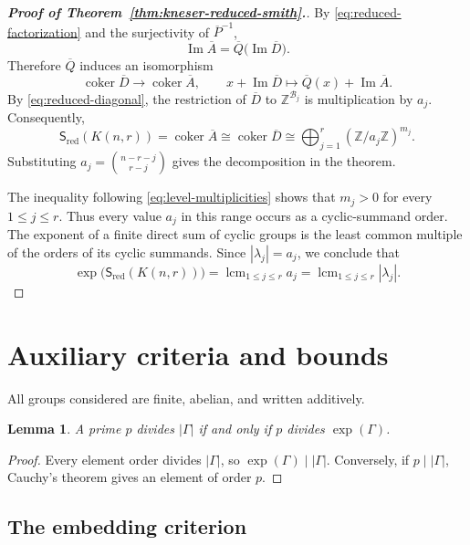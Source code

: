 \documentclass[11pt,reqno]{amsart}
\theoremstyle{plain}
\newtheorem{lemma}[theorem]{Lemma}
\theoremstyle{definition}
\theoremstyle{remark}
\DeclareMathOperator{\ex}{exp}
\newcommand{\Sred}{\mathsf S_{\mathrm{red}}}
\begin{document}
\begin{proof}[\textnormal{\textbf{Proof of Theorem~\ref{thm:kneser-reduced-smith}.}}]
By \eqref{eq:reduced-factorization} and the surjectivity of
$\overline P^{-1}$,
\[
  \operatorname{Im}\overline A
  =\overline Q\bigl(\operatorname{Im}\overline D\bigr).
\]
Therefore $\overline Q$ induces an isomorphism
\[
  \operatorname{coker}\overline D
  \longrightarrow
  \operatorname{coker}\overline A,
  \qquad
  x+\operatorname{Im}\overline D
  \longmapsto
  \overline Q(x)+\operatorname{Im}\overline A.
\]
By \eqref{eq:reduced-diagonal}, the restriction of $\overline D$ to
$\mathbb Z^{\mathcal B_j}$ is multiplication by $a_j$. Consequently,
\[
  \Sred(K(n,r))
  =\operatorname{coker}\overline A
  \cong
  \operatorname{coker}\overline D
  \cong
  \bigoplus_{j=1}^r
  \left(\mathbb Z/a_j\mathbb Z\right)^{m_j}.
\]
Substituting $a_j=\binom{n-r-j}{r-j}$ gives the decomposition in the theorem.

The inequality following \eqref{eq:level-multiplicities} shows that $m_j>0$ for
every $1\le j\le r$. Thus every value $a_j$ in this range occurs as a
cyclic-summand order. The exponent of a finite direct sum of cyclic groups is
the least common multiple of the orders of its cyclic summands.
Since $|\lambda_j|=a_j$, we conclude that
\[
  \ex\bigl(\Sred(K(n,r))\bigr)
  =\operatorname{lcm}_{1\le j\le r}a_j
  =\operatorname{lcm}_{1\le j\le r}|\lambda_j|.
\]
\end{proof}

\section{Auxiliary criteria and bounds}\label{sec:tools}

All groups considered are finite, abelian, and written additively.

\begin{lemma}\label{lem:radical}
A prime $p$ divides $|\Gamma|$ if and only if $p$ divides $\ex(\Gamma)$.
\end{lemma}

\begin{proof}
Every element order divides $|\Gamma|$, so $\ex(\Gamma)\mid|\Gamma|$.
Conversely, if $p\mid|\Gamma|$, Cauchy's theorem gives an element of order
$p$.
\end{proof}

\subsection{The embedding criterion}
\end{document}
